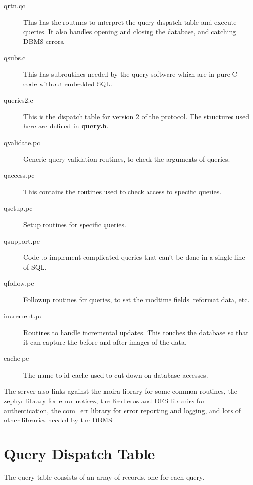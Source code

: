 \begin{description}
\item[qrtn.qc]		This has the routines to interpret the query
			dispatch table and execute queries.  It also
			handles opening and closing the database, and
			catching DBMS errors.

\item[qsubs.c]		This has subroutines needed by the query
			software which are in pure C code without
			embedded SQL.

\item[queries2.c]	This is the dispatch table for version 2 of
			the protocol. The structures used here are
			defined in {\bf query.h}.

\item[qvalidate.pc]	Generic query validation routines, to check
			the arguments of queries.

\item[qaccess.pc]	This contains the routines used to check
			access to specific queries.

\item[qsetup.pc]	Setup routines for specific queries.

\item[qsupport.pc]	Code to implement complicated queries that
			can't be done in a single line of SQL.

\item[qfollow.pc]	Followup routines for queries, to set the
			modtime fields, reformat data, etc.

\item[increment.pc]	Routines to handle incremental updates.  This
			touches the database so that it can capture
			the before and after images of the data.

\item[cache.pc]		The name-to-id cache used to cut down on
			database accesses.
\end{description}

The server also links against the moira library for some common
routines, the zephyr library for error notices, the Kerberos and DES
libraries for authentication, the com\_err library for error reporting
and logging, and lots of other libraries needed by the DBMS.


\section{Query Dispatch Table}

The query table consists of an array of records, one for each query.

